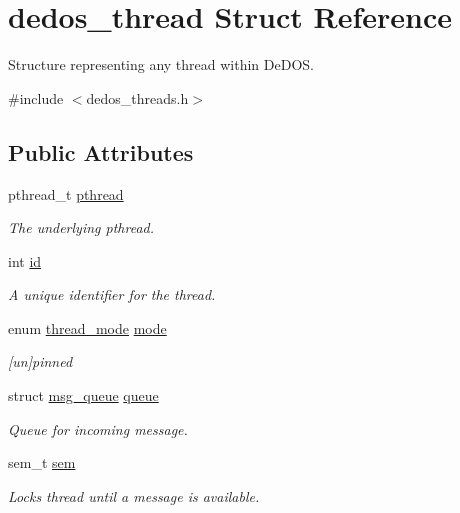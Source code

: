 \hypertarget{structdedos__thread}{\section{dedos\-\_\-thread Struct Reference}
\label{structdedos__thread}
}


Structure representing any thread within De\-D\-O\-S.  




{\ttfamily \#include $<$dedos\-\_\-threads.\-h$>$}

\subsection*{Public Attributes}
\begin{DoxyCompactItemize}
\item 
pthread\-\_\-t \hyperlink{structdedos__thread_a7a40b7dea35c3ebfb87974126bdd52f8}{pthread}
\begin{DoxyCompactList}\small\item\em The underlying pthread. \end{DoxyCompactList}\item 
int \hyperlink{structdedos__thread_a9ec2f386c1e31415ee26e54c39f0f02a}{id}
\begin{DoxyCompactList}\small\item\em A unique identifier for the thread. \end{DoxyCompactList}\item 
enum \hyperlink{dfg_8h_a673ccd9aadafd31e8beaf16423c07db2}{thread\-\_\-mode} \hyperlink{structdedos__thread_a70d31c1db4f14b59fd88148f5a4d8cbb}{mode}
\begin{DoxyCompactList}\small\item\em \mbox{[}un\mbox{]}pinned \end{DoxyCompactList}\item 
struct \hyperlink{structmsg__queue}{msg\-\_\-queue} \hyperlink{structdedos__thread_ace61dc188bd6d8018126c508b1a42493}{queue}
\begin{DoxyCompactList}\small\item\em Queue for incoming message. \end{DoxyCompactList}\item 
sem\-\_\-t \hyperlink{structdedos__thread_ababe14eb9fbd46f21932e27b04785973}{sem}
\begin{DoxyCompactList}\small\item\em Locks thread until a message is available. \end{DoxyCompactList}\item 

\end{DoxyCompactItemize}
